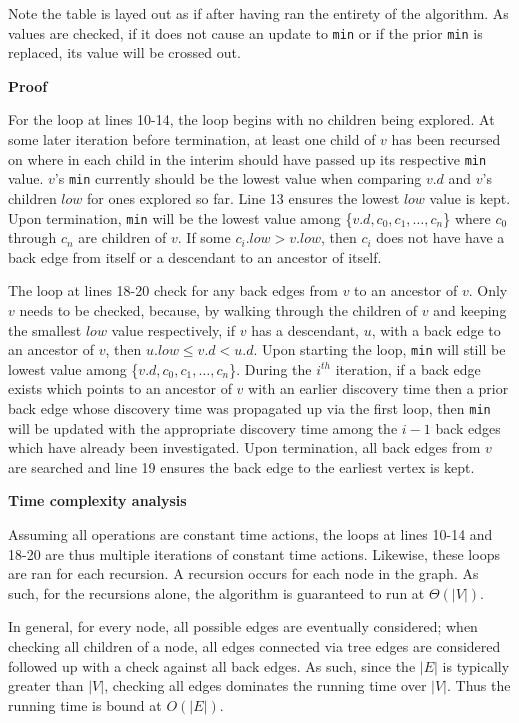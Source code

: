 \documentclass{article}
\begin{document}
Note the table is layed out as if after having ran the entirety of the 
algorithm. As values are checked, if it does not cause an update to \texttt{min}
or if the prior \texttt{min} is replaced, its value will be crossed out. 

\textbf{Proof}

For the loop at lines 10-14, the loop begins with no children being explored. At
some later iteration before termination, at least one child of $v$ has been 
recursed on where in each child in the interim should have passed up its 
respective \texttt{min} value. $v$'s \texttt{min} currently should be the 
lowest value when comparing $v.d$ and $v$'s children $low$ for ones explored so
far. Line 13 ensures the lowest $low$ value is kept. Upon termination,
\texttt{min} will be the lowest value among \{$v.d, c_0, c_1, \ldots, c_n$\} 
where $c_0$ through $c_n$ are children of $v$. If some $c_i.low > v.low$, then 
$c_i$ does not have have a back edge from itself or a descendant to an ancestor
of itself. 

The loop at lines 18-20 check for any back edges from $v$ to an ancestor of $v$.
Only $v$ needs to be checked, because, by walking through the children of $v$ 
and keeping the smallest $low$ value respectively, if $v$ has a descendant, $u$,
with a back edge to an ancestor of $v$, then $u.low \le v.d < u.d$. Upon 
starting the loop, \texttt{min} will still be lowest value among \{$v.d, c_0, 
c_1, \ldots, c_n$\}. During the $i^{th}$ iteration, if a back edge exists which
points to an ancestor of $v$ with an earlier discovery time then a prior back
edge whose discovery time was propagated up via the first loop, then 
\texttt{min} will be updated with the appropriate discovery time among the
$i-1$ back edges which have already been investigated. Upon termination, all 
back edges from $v$ are searched and line 19 ensures the back edge to the 
earliest vertex is kept. 

\textbf{Time complexity analysis}

Assuming all operations are constant time actions, the loops at lines 10-14 and
18-20 are thus multiple iterations of constant time actions. Likewise, these 
loops are ran for each recursion. A recursion occurs for each node in the graph.
As such, for the recursions alone, the algorithm is guaranteed to run at 
$\Theta(|V|)$. 

In general, for every node, all possible edges are eventually considered; when 
checking all children of a node, all edges connected via tree edges are 
considered followed up with a check against all back edges. As such, since the 
$|E|$ is typically greater than $|V|$, checking all edges dominates the running 
time over $|V|$. Thus the running time is bound at $O(|E|)$. 
\end{document}
